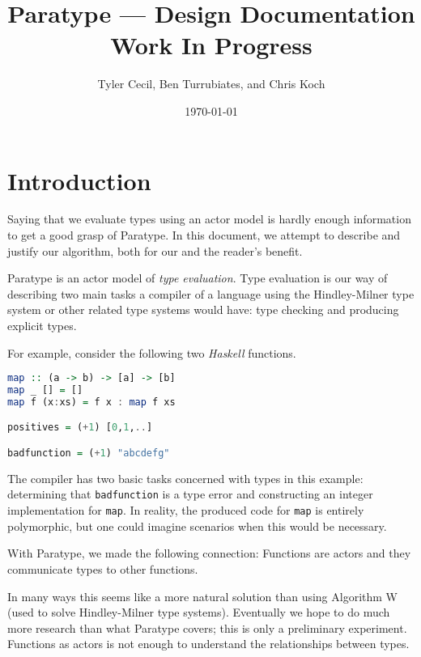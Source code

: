 \documentclass[10pt]{article}
\begin{document}
\title{Paratype --- Design Documentation\\
Work In Progress}
\author{Tyler Cecil, Ben Turrubiates, and Chris Koch}
\date{\today}
\maketitle

\tableofcontents

\pagebreak

\section{Introduction}
Saying that we evaluate types using an actor model is hardly enough information
to get a good grasp of Paratype. In this document, we attempt to
describe and justify our algorithm, both for our and the reader's benefit.

Paratype is an actor model of \emph{type evaluation}. Type evaluation is our
way of describing two main tasks a compiler of a language using the
Hindley-Milner type system or other related type systems would have: type
checking and producing explicit types.

For example, consider the following two \emph{Haskell} functions.
\begin{lstlisting}[language=Haskell,caption=Haskell example,label=lst:haskell]
map :: (a -> b) -> [a] -> [b]
map _ [] = []
map f (x:xs) = f x : map f xs

positives = (+1) [0,1,..]

badfunction = (+1) "abcdefg"
\end{lstlisting}

The compiler has two basic tasks concerned with types in this example:
determining that \lstinline!badfunction! is a type error and constructing an
integer implementation for \lstinline!map!. In reality, the produced code for
\lstinline!map! is entirely polymorphic, but one could imagine scenarios when
this would be necessary.

With Paratype, we made the following connection: Functions are actors and they
communicate types to other functions.

In many ways this seems like a more natural solution than using Algorithm W
(used to solve Hindley-Milner type systems). Eventually we hope to do much more
research than what Paratype covers; this is only a preliminary experiment.
Functions as actors is not enough to understand the relationships between
types.
\end{document}
